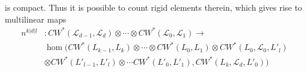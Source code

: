 \documentclass{amsart}
\numberwithin{equation}{section}
\numberwithin{figure}{section}
\begin{document}
is compact. Thus it is possible to count rigid elements therein, which gives rise to multilinear maps
\begin{equation}\label{bimodule homomorphism: higher orders}
\begin{split}
n^{k|d|l}&: CW^{*}(\mathcal{L}_{d-1}, \mathcal{L}_{d}) \otimes \cdots \otimes CW^{*}(\mathcal{L}_{0}, \mathcal{L}_{1}) \to\\
&\hom(CW^{*}(L_{k-1}, L_{k}) \otimes \cdots \otimes CW^{*}(L_{0}, L_{1}) \otimes CW^{*}(L_{0}, \mathcal{L}_{0}, L'_{l})\\
&\otimes CW^{*}(L'_{l-1}, L'_{l}) \otimes \cdots CW^{*}(L'_{0}, L'_{1}), CW^{*}(L_{k}, \mathcal{L}_{d}, L'_{0}))
\end{split}
\end{equation} \par
\end{document}
